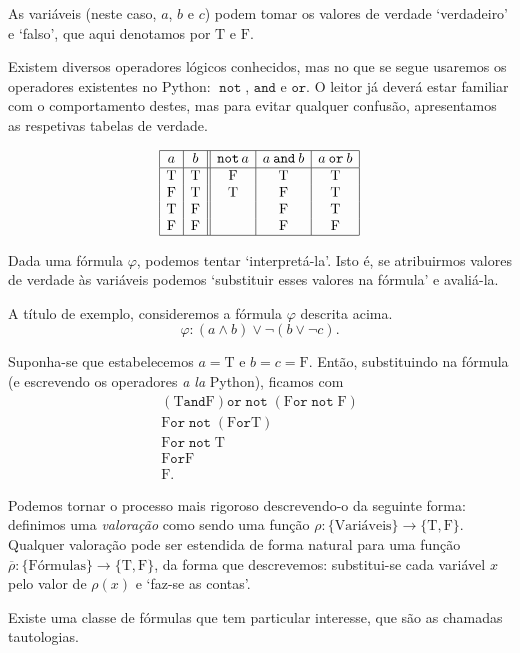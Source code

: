 \documentclass{report}
\theoremstyle{definition}
\theoremstyle{remark}
\newcommand{\lt}{\mathrm{T}}
\newcommand{\lf}{\mathrm{F}}
\DeclareMathOperator{\pnot}{\texttt{not}}
\newcommand{\pand}{\mathbin{\texttt{and}}}
\newcommand{\por}{\mathbin{\texttt{or}}}
\begin{document}
	As variáveis (neste caso, $a$, $b$ e $c$) podem tomar os valores de verdade `verdadeiro' e `falso', que aqui denotamos por $\lt$ e $\lf$.
	
	Existem diversos operadores lógicos conhecidos, mas no que se segue usaremos os operadores existentes no Python: $\pnot$, $\pand$ e $\por$. O leitor já deverá estar familiar com o comportamento destes, mas para evitar qualquer confusão, apresentamos as respetivas tabelas de verdade.
	
	\[\label{tabela:operadores}
	\begin{array}{|c|c||c|c|c|}
	\hline
	a & b & \pnot a & a \pand b & a \por b\\
	\hline
	\lt & \lt & \lf & \lt & \lt\\
	\lf & \lt & \lt & \lf & \lt\\
	\lt & \lf &     & \lf & \lt\\
	\lf & \lf &     & \lf & \lf\\
	\hline
	\end{array}
	\]
	
	Dada uma fórmula $\varphi$, podemos tentar `interpretá-la'. Isto é, se atribuirmos valores de verdade às variáveis podemos `substituir esses valores na fórmula' e avaliá-la.
	
	A título de exemplo, consideremos a fórmula $\varphi$ descrita acima.
	\[\varphi : (a \land b) \lor \neg (b \lor \neg c).\]
	
	Suponha-se que estabelecemos $a = \lt$ e $b = c = \lf$. Então, substituindo na fórmula (e escrevendo os operadores \textit{a la} Python), ficamos com
	\begin{gather*}
	(\lt \pand \lf) \por \pnot (\lf \por \pnot \lf)\\
	\lf \por \pnot (\lf \por \lt)\\
	\lf \por \pnot \lt\\
	\lf \por \lf\\
	\lf.
	\end{gather*}
	
	Podemos tornar o processo mais rigoroso descrevendo-o da seguinte forma: definimos uma \emph{valoração} como sendo uma função $\rho : \{\text{Variáveis}\} \to \{\lt, \lf\}$. Qualquer valoração pode ser estendida de forma natural para uma função ${\overline\rho : \{\text{Fórmulas}\} \to \{\lt, \lf\}}$, da forma que descrevemos: substitui-se cada variável $x$ pelo valor de $\rho(x)$ e `faz-se as contas'.
	
	Existe uma classe de fórmulas que tem particular interesse, que são as chamadas tautologias.
	
\end{document}
